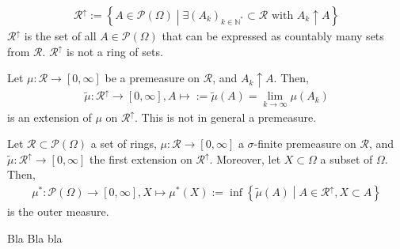 \begin{definition}
    \begin{align}
        \mathcal{R}^{\uparrow} := \left\{A \in \mathcal{P}(\Omega) \middle| \exists (A_k)_{k \in \mathbb{N}^*} \subset \mathcal{R} \text{ with } A_k \uparrow A  \right\}
    \end{align}
    \(\mathcal{R}^{\uparrow}\) is the set of all \(A \in \mathcal{P}(\Omega)\) that can be expressed as countably many sets from \(\mathcal{R}\). \(\mathcal{R}^{\uparrow}\) is not a ring of sets.
\end{definition}
\begin{definition}
    Let \(\mu : \mathcal{R} \rightarrow [0, \infty]\) be a premeasure on \(\mathcal{R}\), and \(A_k \uparrow A\). Then,
    \begin{align}
        \tilde\mu : \mathcal{R}^\uparrow \rightarrow [0, \infty], A \mapsto := \tilde\mu(A) = \lim_{k \rightarrow \infty} \mu (A_k)
    \end{align}
    is an extension of \(\mu\) on \(\mathcal{R}^\uparrow\). This is not in general a premeasure.
\end{definition}
\begin{theorem}
    
\end{theorem}
\begin{definition}
    Let \(\mathcal{R} \subset \mathcal{P}(\Omega)\) a set of rings, \(\mu: \mathcal{R} \rightarrow [0, \infty]\) a \(\sigma\)-finite premeasure on \(\mathcal{R}\), and \(\tilde\mu: \mathcal{R}^\uparrow \rightarrow [0, \infty]\) the first extension on \(\mathcal{R}^\uparrow\). Moreover, let \(X \subset \Omega\) a subset of \(\Omega\). Then,
    \begin{align}
        \mu^* : \mathcal{P}(\Omega) \rightarrow [0, \infty], X \mapsto \mu^* (X) := \inf \left\{ \tilde\mu(A) \middle| A \in \mathcal{R}^\uparrow, X \subset A \right\}
    \end{align}
    is the outer measure.
\end{definition}
\begin{theorem}
    
\end{theorem}
Bla Bla bla
\begin{definition}
    
\end{definition}